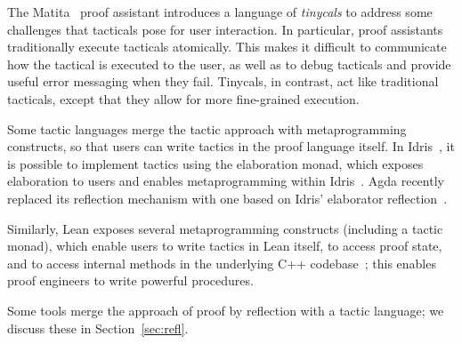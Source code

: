 The Matita~\citep{asperti2007user} proof assistant introduces
a language of \textit{tinycals} to address some challenges that tacticals
pose for user interaction. In particular, proof assistants traditionally execute tacticals
atomically. This makes it difficult to communicate how the tactical is executed to the user,
as well as to debug tacticals and provide useful error messaging when they fail.
Tinycals, in contrast, act like traditional tacticals, except that they allow
for more fine-grained execution.

Some tactic languages merge the tactic approach with metaprogramming constructs,
so that users can write tactics in the proof language itself.
In Idris~\citep{brady2013idris}, it is possible to implement tactics using the elaboration monad, which exposes
elaboration to users and enables metaprogramming within Idris~\citep{Christiansen2016}.
Agda recently replaced its reflection mechanism
with one based on Idris' elaborator reflection~\citep{agda-elab}.

Similarly, Lean exposes several metaprogramming constructs (including a tactic monad),
which enable users to write tactics in Lean itself, to access proof state, and to access
internal methods in the underlying C++ codebase~\citep{Ebner2017};
this enables proof engineers to write powerful procedures.

Some tools merge the approach of proof by reflection
with a tactic language; we discuss these in Section~\ref{sec:refl}.


